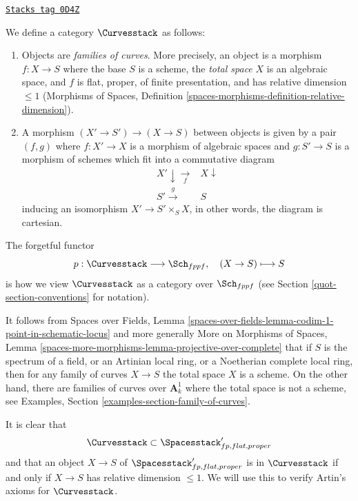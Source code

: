 \begin{definition}
\label{quot-situation-curves}
\href{https://stacks.math.columbia.edu/tag/0D4Z}{\texttt{Stacks tag 0D4Z}}

We define a category $\Curvesstack$ as follows:
\begin{enumerate}
\item Objects are {\it families of curves}. More precisely, an
object is a morphism $f : X \to S$ where the base $S$ is a scheme,
the {\it total space} $X$ is an algebraic space, and
$f$ is flat, proper, of finite presentation,
and has relative dimension $\leq 1$ (Morphisms of Spaces, Definition
\ref{spaces-morphisms-definition-relative-dimension}).
\item A morphism $(X' \to S') \to (X \to S)$ between objects
is given by a pair $(f, g)$ where $f : X' \to X$ is a morphism
of algebraic spaces and $g : S' \to S$ is a morphism of schemes
which fit into a commutative diagram
$$
\begin{array}{cc}X' \downarrow\underset{f}{\longrightarrow} & X \downarrow \\ S' \overset{g}{\longrightarrow} & S\end{array}
$$
inducing an isomorphism $X' \to S' \times_S X$, in other words, the
diagram is cartesian.
\end{enumerate}
The forgetful functor
$$
p : \Curvesstack \longrightarrow \Sch_{fppf},\quad
(X \to S) \longmapsto S
$$
is how we view $\Curvesstack$ as a category over $\Sch_{fppf}$
(see Section \ref{quot-section-conventions} for notation).
\end{definition}

It follows from Spaces over Fields, Lemma
\ref{spaces-over-fields-lemma-codim-1-point-in-schematic-locus}
and more generally
More on Morphisms of Spaces, Lemma
\ref{spaces-more-morphisms-lemma-projective-over-complete}
that if $S$ is the spectrum of a field, or an Artinian local ring,
or a Noetherian complete local ring, then for any family of curves
$X \to S$ the total space $X$ is a scheme.
On the other hand, there are families of curves
over $\mathbf{A}^1_k$ where the total space is not a scheme, see
Examples, Section \ref{examples-section-family-of-curves}.

\medskip\noindent
It is clear that
\begin{equation}
\label{equation-curves-over-proper-spaces}
\Curvesstack \subset \Spacesstack'_{fp, flat, proper}
\end{equation}
and that an object $X \to S$ of $\Spacesstack'_{fp, flat, proper}$
is in $\Curvesstack$ if and only if $X \to S$ has relative
dimension $\leq 1$. We will use this to verify Artin's axioms
for $\Curvesstack$.

